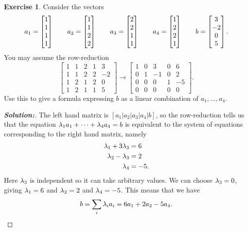 \documentclass[a4paper]{amsart}
\theoremstyle{definition}
\newtheorem{exercise}{Exercise}
\newenvironment{solution}{\begin{proof}[\textbf{Solution:}] \vphantom{u}}{\end{proof}}
\begin{document}
\begin{exercise}\label{ex-combination-iii}
 Consider the vectors
 \[
  a_1 = \left[\begin{matrix} 1 \\  1 \\ 1 \\ 1 \end{matrix}\right] \qquad
  a_2 = \left[\begin{matrix} 1 \\  1 \\ 2 \\ 2 \end{matrix}\right] \qquad
  a_3 = \left[\begin{matrix} 2 \\  2 \\ 1 \\ 1 \end{matrix}\right] \qquad
  a_4 = \left[\begin{matrix} 1 \\  2 \\ 2 \\ 1 \end{matrix}\right] \qquad
  b   = \left[\begin{matrix} 3 \\ -2 \\ 0 \\ 5 \end{matrix}\right].
 \]
 You may assume the row-reduction
 \[ 
  \left[\begin{array}{cccc|c}
   1 & 1 & 2 & 1 &  3 \\
   1 & 1 & 2 & 2 & -2 \\
   1 & 2 & 1 & 2 &  0 \\
   1 & 2 & 1 & 1 &  5
  \end{array}\right]
  \to 
  \left[\begin{array}{cccc|c}
   1 & 0 &  3 & 0 &  6 \\
   0 & 1 & -1 & 0 &  2 \\
   0 & 0 &  0 & 1 & -5 \\
   0 & 0 &  0 & 0 &  0 
  \end{array}\right].
 \]
 Use this to give a formula expressing $b$ as a linear combination of
 $a_1,\dotsc,a_4$. 
\end{exercise}
\begin{solution}
 The left hand matrix is $[a_1|a_2|a_3|a_4|b]$, so the row-reduction
 tells us that the equation $\lambda_1a_1+\dotsb+\lambda_4a_4=b$ is equivalent
 to the system of equations corresponding to the right hand matrix,
 namely 
 \begin{align*}
  \lambda_1+3\lambda_3 &= 6 \\
  \lambda_2-\lambda_3  &= 2 \\
  \lambda_4        &= -5.
 \end{align*}
 Here $\lambda_3$ is independent so it can take arbitrary values.  We can
 choose $\lambda_3=0$, giving $\lambda_1=6$ and $\lambda_2=2$ and $\lambda_4=-5$.
 This means that we have
 \[ b = \sum_i\lambda_ia_i = 6a_1+2a_2-5a_4. \]
\end{solution}
\end{document}
